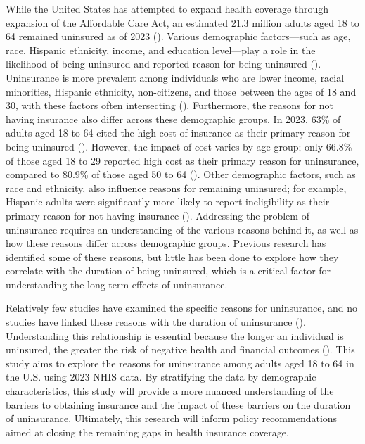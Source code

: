 \documentclass[12pt]{article}
\begin{document}
While the United States has attempted to expand health coverage through expansion of the Affordable Care Act, an estimated 21.3 million adults aged 18 to 64 remained uninsured as of 2023 (\cite{tolbert_key_2024}). Various demographic factors—such as age, race, Hispanic ethnicity, income, and education level—play a role in the likelihood of being uninsured and reported reason for being uninsured (\cite{lee_convergence_2021}). Uninsurance is more prevalent among individuals who are lower income, racial minorities, Hispanic ethnicity, non-citizens, and those between the ages of 18 and 30, with these factors often intersecting (\cite{gunja_who_2019, okoro_lack_2015, wisk_inequalities_2019}). Furthermore, the reasons for not having insurance also differ across these demographic groups. In 2023, 63\% of adults aged 18 to 64 cited the high cost of insurance as their primary reason for being uninsured (\cite{tolbert_key_2024}). However, the impact of cost varies by age group; only 66.8\% of those aged 18 to 29 reported high cost as their primary reason for uninsurance, compared to 80.9\% of those aged 50 to 64 (\cite{cha_reasons_2020}). Other demographic factors, such as race and ethnicity, also influence reasons for remaining uninsured; for example, Hispanic adults were significantly more likely to report ineligibility as their primary reason for not having insurance (\cite{cha_reasons_2020}). Addressing the problem of uninsurance requires an understanding of the various reasons behind it, as well as how these reasons differ across demographic groups. Previous research has identified some of these reasons, but little has been done to explore how they correlate with the duration of being uninsured, which is a critical factor for understanding the long-term effects of uninsurance.


Relatively few studies have examined the specific reasons for uninsurance, and no studies have linked these reasons with the duration of uninsurance (\cite{wisk_inequalities_2019, xie_patterns_2025, cha_reasons_2020, collins_potential_2018}). Understanding this relationship is essential because the longer an individual is uninsured, the greater the risk of negative health and financial outcomes (\cite{davis_uninsured_2007}). This study aims to explore the reasons for uninsurance among adults aged 18 to 64 in the U.S. using 2023 NHIS data. By stratifying the data by demographic characteristics, this study will provide a more nuanced understanding of the barriers to obtaining insurance and the impact of these barriers on the duration of uninsurance. Ultimately, this research will inform policy recommendations aimed at closing the remaining gaps in health insurance coverage.
\end{document}
